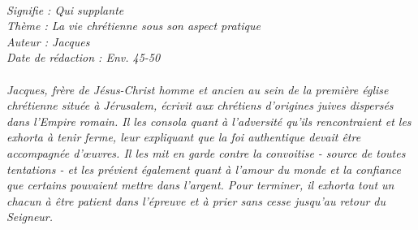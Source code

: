 \BFont
\noindent\hrulefill
{\footnotesize
\textit{
\bigskip
{\centering{}
\\Signifie : Qui supplante
\\Thème : La vie chrétienne sous son aspect pratique
\\Auteur : Jacques
\\Date de rédaction : Env. 45-50\\}
}
\textit{
\\Jacques, frère de Jésus-Christ homme et ancien au sein de la première église chrétienne située à Jérusalem, écrivit aux chrétiens d’origines juives dispersés dans l’Empire romain. Il les consola quant à l’adversité qu’ils rencontraient et les exhorta à tenir ferme, leur expliquant que la foi authentique devait être accompagnée d’œuvres. Il les mit en garde contre la convoitise - source de toutes tentations - et les prévient également quant à l’amour du monde et la confiance que certains pouvaient mettre dans l’argent. Pour terminer, il exhorta tout un chacun à être patient dans l’épreuve et à prier sans cesse jusqu’au retour du Seigneur.\bigskip
}
}
\par\nobreak\noindent\hrulefill
